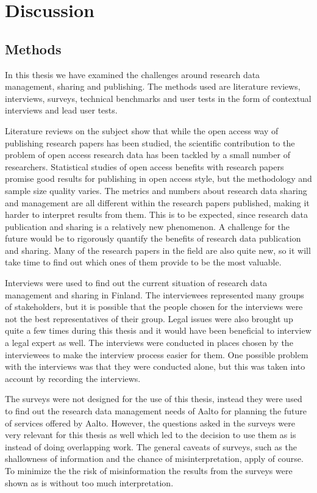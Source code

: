 \chapter{Discussion}
\label{chapter:discussion}

\section{Methods}

In this thesis we have examined the challenges around research data management,
sharing and publishing. The methods used are literature reviews,
interviews, surveys, technical benchmarks and user tests in the form of contextual
interviews and lead user tests.

Literature reviews on the subject show that while the open access way of
publishing research papers has been studied, the scientific contribution to
the problem of open access research data has been tackled by a small number
of researchers. Statistical studies of open access benefits with research
papers promise good results for publishing in open access style, but the
methodology and sample size quality varies. The metrics and numbers about
research data sharing and management are all different within the research
papers published, making it harder to interpret results from them. This is to
be expected, since research data publication and sharing is a relatively new
phenomenon. A challenge for the future would be to rigorously quantify the
benefits of research data publication and sharing. Many of the research papers
in the field are also quite new, so it will take time to find out which ones
of them provide to be the most valuable.

Interviews were used to find out the current situation of research data
management and sharing in Finland. The interviewees represented many groups
of stakeholders, but it is possible that the people chosen for the interviews
were not the best representatives of their group. Legal issues were also
brought up quite a few times during this thesis and it would have been
beneficial to interview a legal expert as well. The interviews were conducted
in places chosen by the interviewees to make the interview process easier
for them. One possible problem with the interviews was that they were
conducted alone, but this was taken into account by recording the interviews.

The surveys were not designed for the use of this thesis, instead they were used
to find out the research data management needs of Aalto for planning the
future of services offered by Aalto. However, the questions asked in the
surveys were very relevant for this thesis as well which led to the decision
to use them as is instead of doing overlapping work. The general caveats of
surveys, such as the shallowness of information and the chance of
misinterpretation, apply of course. To minimize the the risk of misinformation
the results from the surveys were shown as is without too much interpretation.

